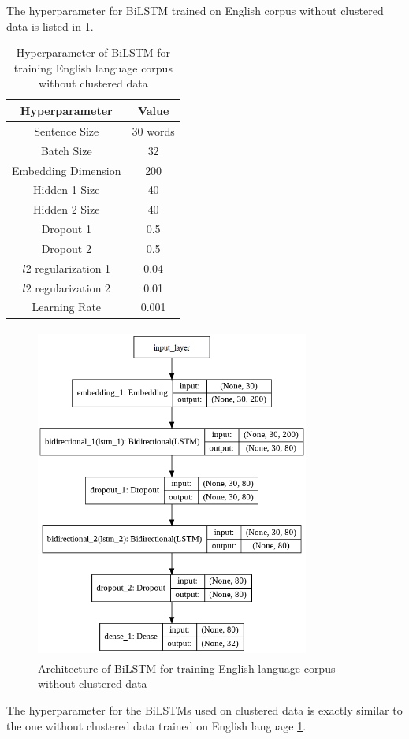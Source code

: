 The hyperparameter for \gls{BiLSTM} trained on English corpus without clustered data is listed in \ref{table:hyperparameterLSTM32class}. 

\begin{table}[!ht]
\centering
\begin{tabular}{cc}
\hline
\textbf{Hyperparameter} & \textbf{Value} \\ \hline
Sentence Size & 30 words \\
Batch Size & 32 \\
Embedding Dimension & 200 \\
Hidden 1 Size & 40 \\
Hidden 2 Size & 40 \\
Dropout 1 & 0.5 \\
Dropout 2 & 0.5 \\
$l2$ regularization 1 & 0.04 \\
$l2$ regularization 2 & 0.01 \\
Learning Rate & 0.001 \\ \hline
\end{tabular}
 \captionsetup{justification=centering,margin=1cm}
\caption{Hyperparameter of \gls{BiLSTM} for training English language corpus without clustered data}
\label{table:hyperparameterLSTM32class}
\end{table}


\begin{figure}[!ht]
    \centering
    \includegraphics[width=9cm, height=11cm]{pics/EN_32.png}
    \captionsetup{justification=centering,margin=1cm}
    \caption{Architecture of \gls{BiLSTM} for training English language corpus without clustered data}
    \label{fig:PlainLSTM}
\end{figure}
\clearpage
The hyperparameter for the \glspl{BiLSTM} used on clustered data is exactly similar to the one without clustered data trained on English language \ref{table:hyperparameterLSTM32class}.

